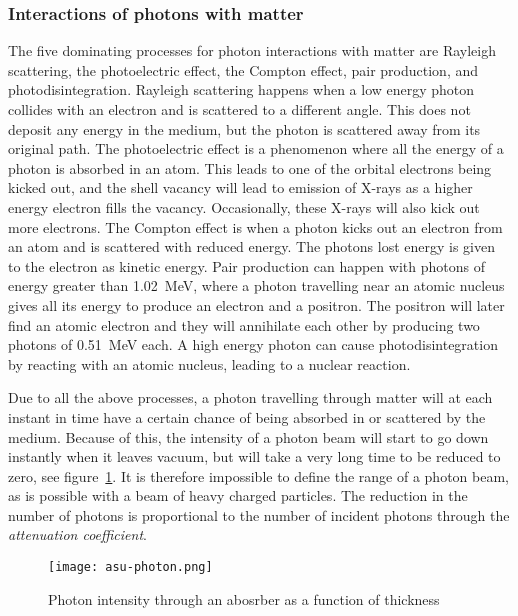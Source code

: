 \documentclass[../main/thesis.tex]{subfiles}
\begin{document}
\subsubsection{Interactions of photons with matter}
\label{t-photon}
The five dominating processes for photon interactions with matter are Rayleigh scattering, the photoelectric effect, the Compton effect, pair production, and photodisintegration. Rayleigh scattering happens when a low energy photon collides with an electron and is scattered to a different angle. This does not deposit any energy in the medium, but the photon is scattered away from its original path. The photoelectric effect is a phenomenon where all the energy of a photon is absorbed in an atom. This leads to one of the orbital electrons being kicked out, and the shell vacancy will lead to emission of X-rays as a higher energy electron fills the vacancy. Occasionally, these X-rays will also kick out more electrons. The Compton effect is when a photon kicks out an electron from an atom and is scattered with reduced energy. The photons lost energy is given to the electron as kinetic energy. Pair production can happen with photons of energy greater than 1.02~MeV, where a photon travelling near an atomic nucleus gives all its energy to produce an electron and a positron. The positron will later find an atomic electron and they will annihilate each other by producing two photons of 0.51~MeV each. A high energy photon can cause photodisintegration by reacting with an atomic nucleus, leading to a nuclear reaction. \citep[chap. 2 $\&$ 5]{Khan} 

Due to all the above processes, a photon travelling through matter will at each instant in time have a certain chance of being absorbed in or scattered by the medium. Because of this, the intensity of a photon beam will start to go down instantly when it leaves vacuum, but will take a very long time to be reduced to zero, see figure~\ref{fig-photon}. It is therefore impossible to define the range of a photon beam, as is possible with a beam of heavy charged particles. The reduction in the number of photons is proportional to the number of incident photons through the \textit{attenuation coefficient}. \citep[chap. 5]{Khan} 

\begin{figure}[h]
	\centering
	\texttt{[image: asu-photon.png]}%
	\caption{Photon intensity through an abosrber as a function of thickness \citep{asu2000}}
	\label{fig-photon}
\end{figure}
\end{document}
